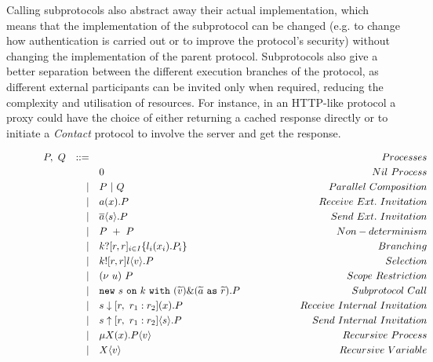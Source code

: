 \documentclass[12pt,twoside]{report}
\newcommand{\white}{\ \ \ \ \ \ \ \ \ \ \ \ }
\begin{document}
Calling subprotocols also abstract away their actual implementation, which means that the implementation of the subprotocol can be changed (e.g. to change how authentication is carried out or to improve the protocol's security) without changing the implementation of the parent protocol. Subprotocols also give a better separation between the different execution branches of the protocol, as different external participants can be invited only when required, reducing the complexity and utilisation of resources. For instance, in an HTTP-like protocol a proxy could have the choice of either returning a cached response directly or to initiate a \textit{Contact} protocol to involve the server and get the response. \\

\begin{figure}[h]
    \centering
    \begin{equation*}
    \centering
    \begin{array}{rrlcr}
        P,\ Q & ::= && \white & Processes \\[2.75pt]
             &   & 0 & \white & Nil\ Process  \\[2.75pt]
             & | & P\ |\ Q & \white & Parallel\ Composition  \\[2.75pt]
             & | & a(x).P & \white & Receive\ Ext.\ Invitation \\[2.75pt]
             & | & \overline{a}\langle s \rangle.P & \white & Send\ Ext.\ Invitation \\[2.75pt]
             & | & P\ +\ P & \white & Non-determinism\\[2.75pt]
             & | & k?[r, r]_{i \in I} \{l_i(x_i).P_i\}& \white & Branching \\[2.75pt]
             & | & k![r, r]l \langle v \rangle.P & \white & Selection \\[2.75pt]
             & | & (\nu\ u)\ P & \white & Scope\ Restriction\\[2.75pt] 
             & | & \texttt{new}\ s\ \texttt{on}\ k\ \texttt{with}\ (\widetilde{v})\&(\widetilde{a}\ \texttt{as}\ \widetilde{r}).P & \white & Subprotocol\ Call\\[2.75pt]
             & | & s \downarrow [r,\ r_1 : r_2](x).P & \white & Receive\ Internal\ Invitation\\[2.75pt]
             & | & s \uparrow [r,\ r_1 : r_2]\langle s \rangle.P & \white & Send\ Internal\ Invitation\\[2.75pt]
             & | & \mu X(x).P\langle v \rangle & \white  & Recursive\ Process \\[2.75pt]
             & | & X\langle v \rangle & \white  & Recursive\ Variable\\\\


\end{array}
\end{equation*}
\end{figure}
\end{document}
